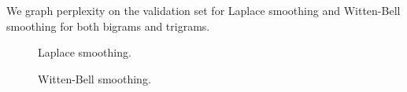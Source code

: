 \documentclass[11pt]{article}
\begin{document}
We graph perplexity on the validation set for Laplace smoothing and Witten-Bell smoothing for both bigrams and trigrams. 

\begin{figure}
\centering
{}
\hfill
{}
\caption{Laplace smoothing.}
\end{figure}

\begin{figure}
\centering
{}
\hfill
{}
\caption{Witten-Bell smoothing.}
\end{figure}
\end{document}
